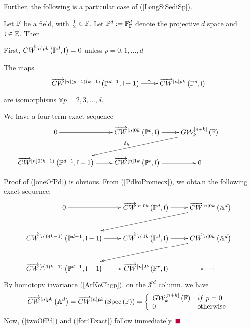 \documentclass[12pt]{article}
\begin{document}
\vspace{3mm}
Further, the following is a particular case of  (\ref{LongSiSediSp}).
\bT\label{longsaPnre}{\rm
Let ${\BF}$ be a field, with $\frac{1}{2}\in {\BF}$. Let ${\BP}^d:={\BP}^d_{{\BF}}$ denote the projective
$d$ space and $\l\in {\BZ}$.  Then  
\bE
 \item\label{oneOfPd} First,    $\ora{CW}^{\LRt{n}pk}\LRf{{\BP}^d, \l} =0$ unless $p=0, 1, \ldots, d$ 
 \item\label{twoOfPd}   The maps
 \begin{equation}\label{ortherTerhInd}
   \diagram
  \ora{CW}^{\LRt{n}(p-1)(k-1)}\LRf{{\BP}^{d-1}, \l-1} \ar[r]^{\qquad\quad \sim} &
 \ora{CW}^{\LRt{n}pk}\LRf{{\BP}^d, \l} \\
 \enddiagram
 \end{equation}
 are isomorphisms $ \forall p= 2, 3, \ldots, d$. 
 \item\label{for4Exact}
 We have a four term exact sequence 
  \begin{equation}\label{khubJoruri}
  \diagram
 0 \ar[r] & %
 \ora{CW}^{\LRt{n}0k}\LRf{{\BP}^d, \l} \ar[r] &  G{\CW}^{\LRt{n+k}}_k\LRf{{\BF}} \ar[lld]_{\delta_k} \\
  \ora{CW}^{\LRt{n}0(k-1)}\LRf{{\BP}^{d-1}, \l-1} \ar[r] &
 \ora{CW}^{\LRt{n}1k}\LRf{{\BP}^d, \l} \ar[r] & 0 &\\
 \enddiagram
  \end{equation} 
 
 \eE

 }
\eT

\pf Proof of (\ref{oneOfPd}) is obvious. %
 From  (\ref{PdkoPromecx}), we obtain the following exact sequence:
  \begin{equation}\label{LonPanTaEqn1011}
 \diagram
 0 \ar[r] %
 &
 \ora{CW}^{\LRt{n}0k}\LRf{{\BP}^d, \l} \ar[r] &  \ora{CW}^{\LRt{n}0k}\LRf{{\BA}^d} \ar[dll] \\
  \ora{CW}^{\LRt{n}0(k-1)}\LRf{{\BP}^{d-1}, \l-1} \ar[r] &
 \ora{CW}^{\LRt{n}1k}\LRf{{\BP}^d, \l} \ar[r] &  \ora{CW}^{\LRt{n}0k}\LRf{{\BA}^d} \ar[dll] \\
   \ora{CW}^{\LRt{n}1(k-1)}\LRf{{\BP}^{d-1}, \l-1} \ar[r] &
 \ora{CW}^{\LRt{n}2k}\LRf{{\BP}^r, \l} \ar[r] & \cdots \\%
 \enddiagram
 \end{equation} 
%
 By homotopy invariance (\ref{ArKoChgp}), on the $3^{rd}$ column, we have
 $$
 \ora{CW}^{\LRt{n}pk}\LRf{{\BA}^d}=  \ora{CW}^{\LRt{n}pk}\LRf{\spec{{\BF}}}=
 \LBrace{{ll}
 G{\CW}_k^{\LRt{n+k}}\LRf{{\BF}} & if ~p=0\\
 0 & {\rm otherwise}\\
 }
 $$
  Now, (\ref{twoOfPd}) and (\ref{for4Exact}) follow immediately. \pic $\eop$
\end{document}
